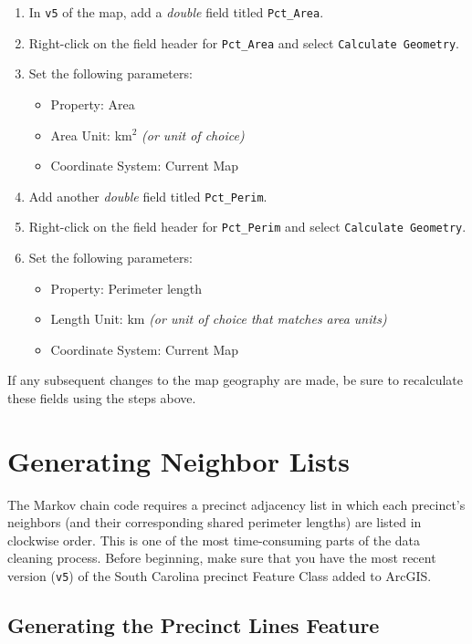 \documentclass[11pt]{article}
\begin{document}
\begin{enumerate}
	\item In \verb|v5| of the map, add a \textit{double} field titled \verb|Pct_Area|. 
	\item Right-click on the field header for \verb|Pct_Area| and select \verb|Calculate Geometry|.
	\item Set the following parameters:
	\begin{itemize}
		\item Property: Area
		\item Area Unit: km$^2$ \textit{(or unit of choice)}
		\item Coordinate System: Current Map
	\end{itemize}
	\item Add another \textit{double} field titled \verb|Pct_Perim|.
	\item Right-click on the field header for \verb|Pct_Perim| and select \verb|Calculate Geometry|.
	\item Set the following parameters:
	\begin{itemize}
		\item Property: Perimeter length
		\item Length Unit: km \textit{(or unit of choice that matches area units)}
		\item Coordinate System: Current Map
	\end{itemize}
\end{enumerate}

If any subsequent changes to the map geography are made, be sure to recalculate these fields using the steps above.

\section{Generating Neighbor Lists}

The Markov chain code requires a precinct adjacency list in which each precinct's neighbors (and their corresponding shared perimeter lengths) are listed in clockwise order. This is one of the most time-consuming parts of the data cleaning process. Before beginning, make sure that you have the most recent version (\verb|v5|) of the South Carolina precinct Feature Class added to ArcGIS.

\subsection{Generating the Precinct Lines Feature}
\end{document}
